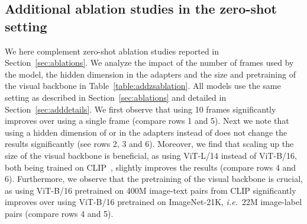 \begin{table}[t]
\begin{center}
\setlength\tabcolsep{1pt}
\vspace{+0.2cm}
\caption{\small Impact of the prompt on the zero-shot multiple-choice VideoQA performance.}
\label{table:promptmc}
\end{center}
\end{table}

\subsection{Additional ablation studies in the zero-shot setting}\label{sec:addzs}
We here complement zero-shot ablation studies reported in Section~\ref{sec:ablations}. 
We analyze the impact of the number of frames  used by the model, the hidden dimension in the adapters  and the size and pretraining of the visual backbone in Table~\ref{table:addzsablation}.
All models use the same setting as described in Section~\ref{sec:ablations} and detailed in Section~\ref{sec:adddetails}.
We first observe that using 10 frames significantly improves over using a single frame (compare rows 1 and 5).
Next we note that using a hidden dimension of  or  in the adapters instead of  does not change the results significantly (see rows 2, 3 and 6).
Moreover, we find that scaling up the size of the visual backbone is beneficial, as using ViT-L/14 instead of ViT-B/16, both being trained on CLIP~\cite{radford2021learning}, slightly improves the results (compare rows 4 and 6).
Furthermore, we observe that the pretraining of the visual backbone is crucial, as using ViT-B/16 pretrained on 400M image-text pairs from CLIP significantly improves over using ViT-B/16 pretrained on ImageNet-21K, \textit{i.e.}~22M image-label pairs (compare rows 4 and 5).

